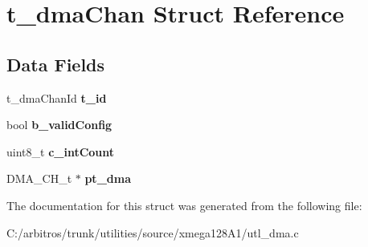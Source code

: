 \hypertarget{structt__dma_chan}{\section{t\-\_\-dma\-Chan Struct Reference}
\label{structt__dma_chan}
}
\subsection*{Data Fields}
\begin{DoxyCompactItemize}
\item 
\hypertarget{structt__dma_chan_a3d29e95e8f372d4d159a7ef03006e28d}{t\-\_\-dma\-Chan\-Id {\bfseries t\-\_\-id}}\label{structt__dma_chan_a3d29e95e8f372d4d159a7ef03006e28d}

\item 
\hypertarget{structt__dma_chan_a73c33a12d6cfbcd5768be5bddef10c27}{bool {\bfseries b\-\_\-valid\-Config}}\label{structt__dma_chan_a73c33a12d6cfbcd5768be5bddef10c27}

\item 
\hypertarget{structt__dma_chan_ad8de5a86599bef13c436790dfa6eacd5}{uint8\-\_\-t {\bfseries c\-\_\-int\-Count}}\label{structt__dma_chan_ad8de5a86599bef13c436790dfa6eacd5}

\item 
\hypertarget{structt__dma_chan_a504d2cb44fb982c1a280b63af3819a55}{D\-M\-A\-\_\-\-C\-H\-\_\-t $\ast$ {\bfseries pt\-\_\-dma}}\label{structt__dma_chan_a504d2cb44fb982c1a280b63af3819a55}

\end{DoxyCompactItemize}


The documentation for this struct was generated from the following file\-:\begin{DoxyCompactItemize}
\item 
C\-:/arbitros/trunk/utilities/source/xmega128\-A1/utl\-\_\-dma.\-c\end{DoxyCompactItemize}
